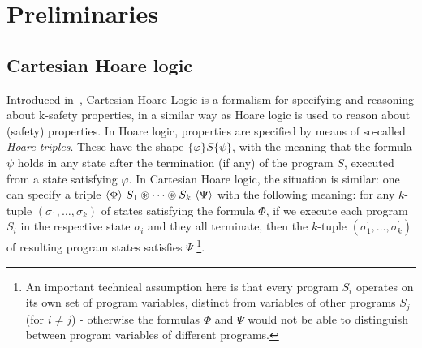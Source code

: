 \section{Preliminaries}



\subsection{Cartesian Hoare logic}

Introduced in~\cite{SousaD16}, Cartesian Hoare Logic is a formalism for
specifying and reasoning about k-safety properties, in a similar way as Hoare
logic is used to reason about (safety) properties. In Hoare logic, properties are
specified by means of so-called \emph{Hoare triples}.  These have the shape
$\{ \varphi \} S \{ \psi \}$, with the meaning that the formula $\psi$ holds
in any state after the termination (if any) of the program $S$, executed from
a state satisfying $\varphi$.  In Cartesian Hoare logic, the situation is
similar: one can specify a triple
$\langle \Phi \rangle\ S_1 \circledast \cdots \circledast S_k\ \langle \Psi \rangle$ with the
following meaning: for any $k$-tuple $(\sigma_1,\ldots,\sigma_k)$ of states
satisfying the formula $\Phi$, if we execute each program $S_i$ in the
respective state $\sigma_i$ and they all terminate, then the $k$-tuple
$(\sigma_1^\prime,\ldots,\sigma_k^\prime)$ of resulting program states
satisfies $\Psi$ \footnote{An important technical assumption here is that
  every program $S_i$ operates on its own set of program variables, distinct
  from variables of other programs $S_j$ (for $i \not = j$) - otherwise the
  formulas $\Phi$ and $\Psi$ would not be able to distinguish between program
  variables of different programs.}.


